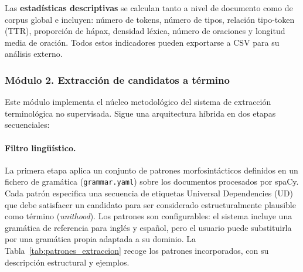 Las \textbf{estadísticas descriptivas} se calculan tanto a nivel de documento como de corpus global e incluyen: número de tokens, número de tipos, relación tipo-token (TTR), proporción de hápax, densidad léxica, número de oraciones y longitud media de oración. Todos estos indicadores pueden exportarse a CSV para su análisis externo.

\subsubsection*{Módulo 2. Extracción de candidatos a término}

Este módulo implementa el núcleo metodológico del sistema de extracción terminológica no supervisada. Sigue una arquitectura híbrida en dos etapas secuenciales:

\paragraph{Filtro lingüístico.} La primera etapa aplica un conjunto de patrones morfosintácticos definidos en un fichero de gramática (\texttt{grammar.yaml}) sobre los documentos procesados por spaCy. Cada patrón especifica una secuencia de etiquetas Universal Dependencies (UD) que debe satisfacer un candidato para ser considerado estructuralmente plausible como término (\textit{unithood}). Los patrones son configurables: el sistema incluye una gramática de referencia para inglés y español, pero el usuario puede substituirla por una gramática propia adaptada a su dominio. La Tabla~\ref{tab:patrones_extraccion} recoge los patrones incorporados, con su descripción estructural y ejemplos.

